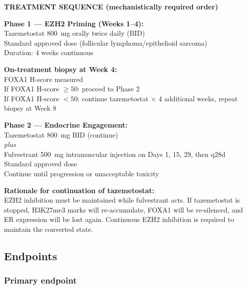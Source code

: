 \documentclass[12pt, a4paper]{article}
\begin{document}
\begin{center}
\colorbox{lockbox}{
\begin{minipage}{0.85\textwidth}
\vspace{0.5em}
\textbf{TREATMENT SEQUENCE (mechanistically required order)}

\medskip
\textbf{Phase 1 --- EZH2 Priming (Weeks 1--4):}\\
Tazemetostat 800~mg orally twice daily (BID)\\
Standard approved dose (follicular lymphoma/epithelioid
sarcoma)\\
Duration: 4 weeks continuous

\medskip
\textbf{On-treatment biopsy at Week 4:}\\
FOXA1 H-score measured\\
If FOXA1 H-score $\geq 50$: proceed to Phase 2\\
If FOXA1 H-score $< 50$: continue tazemetostat
$\times$ 4 additional weeks,
repeat biopsy at Week 8

\medskip
\textbf{Phase 2 --- Endocrine Engagement:}\\
Tazemetostat 800~mg BID (continue)\\
\textit{plus}\\
Fulvestrant 500~mg intramuscular injection on Days 1,
15, 29, then q28d\\
Standard approved dose\\
Continue until progression or unacceptable toxicity

\medskip
\textbf{Rationale for continuation of tazemetostat:}\\
EZH2 inhibition must be maintained while fulvestrant
acts. If tazemetostat is stopped, H3K27me3 marks
will re-accumulate, FOXA1 will be re-silenced,
and ER expression will be lost again.
Continuous EZH2 inhibition is required to maintain
the converted state.
\vspace{0.5em}
\end{minipage}
}
\end{center}

\subsection{Endpoints}

\subsubsection{Primary endpoint}
\end{document}
